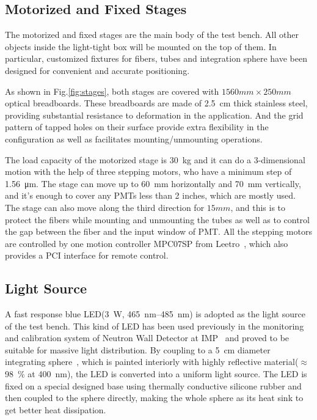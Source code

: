 \documentclass[review, times]{elsarticle}
\begin{document}
\subsection{Motorized and Fixed Stages}
\label{sec:stages}

The motorized and fixed stages are the main body of the test bench.
All other objects inside the light-tight box will be mounted on the top of them.
In particular, customized fixtures for fibers, tubes and integration sphere have been designed for convenient and accurate positioning.

As shown in Fig.\ref{fig:stages}, both stages are covered with $1560mm\times250mm$ optical breadboards. 
These breadboards are made of \SI{2.5}{cm} thick stainless steel, providing substantial resistance to deformation in the application. And the grid pattern of tapped holes on their surface provide extra flexibility in the configuration as well as facilitates mounting/unmounting operations.

The load capacity of the motorized stage is \SI{30}{\kilo\gram} and it can do a 3-dimensional motion with the help of three stepping motors, who have a minimum step of \SI{1.56}{\micro\meter}.
The stage can move up to \SI{60}{\milli\meter} horizontally and \SI{70}{\milli\meter} vertically, and it's enough to cover any PMTs less than 2 inches, which are mostly used.
The stage can also move along the third direction for $15mm$, and this is to protect the fibers while mounting and unmounting the tubes as well as to control the gap between the fiber and the input window of PMT.
All the stepping motors are controlled by one motion controller MPC07SP from Leetro~\cite{leetro}, which also provides a PCI interface for remote control.

\subsection{Light Source}
\label{sec:light_source}

A fast response blue LED(\SI{3}{\watt}, \SIrange{465}{485}{\nano\meter}) is adopted as the light source of the test bench. This kind of LED has been used previously in the monitoring and calibration system of Neutron Wall Detector at IMP~\cite{yuyuhong_led} and proved to be suitable for massive light distribution. 
By coupling to a \SI{5}{\centi\meter} diameter integrating sphere~\cite{integrating_sphere}, which is painted interiorly with highly reflective material($\approx$\SI{98}{\percent} at \SI{400}{\nano\meter}), the LED is converted into a uniform light source.
The LED is fixed on a special designed base using thermally conductive silicone rubber and then coupled to the sphere directly, making the whole sphere as its heat sink to get better heat dissipation.
\end{document}
